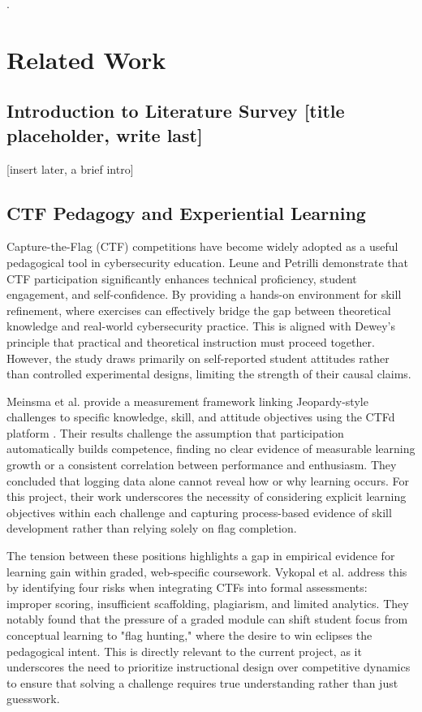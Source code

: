 \newpage
.
\newpage



\section{Related Work}

\subsection{Introduction to Literature Survey [title placeholder, write last]}
[insert later, a brief intro]


\subsection{CTF Pedagogy and Experiential Learning}
Capture-the-Flag (CTF) competitions have become widely adopted as a
useful pedagogical tool in cybersecurity education. Leune and Petrilli \cite{KeesPetrelli} demonstrate that CTF participation significantly enhances technical proficiency, student engagement, and self-confidence. By providing a hands-on environment for skill refinement, where exercises can effectively bridge the gap between theoretical knowledge and real-world cybersecurity practice. This is aligned with Dewey's principle that practical and theoretical instruction must proceed together. However, the study draws primarily on self-reported student attitudes rather than controlled experimental designs, limiting the strength of their causal claims.

Meinsma et al. \cite{Meinsma2022} provide a measurement framework linking Jeopardy-style challenges to specific knowledge, skill, and attitude objectives using the CTFd platform \cite{CTFd}. Their results challenge the assumption that participation automatically builds competence, finding no clear evidence of measurable learning growth or a consistent correlation between performance and enthusiasm. They concluded that logging data alone cannot reveal how or why learning occurs. For this project, their work underscores the necessity of considering explicit learning objectives within each challenge and capturing process-based evidence of skill development rather than relying solely on flag completion.

The tension between these positions highlights a gap in empirical evidence for learning gain within graded, web-specific coursework. Vykopal et al. \cite{Vykopal} address this by identifying four risks when integrating CTFs into formal assessments: improper scoring, insufficient scaffolding, plagiarism, and limited analytics. They notably found that the pressure of a graded module can shift student focus from conceptual learning to "flag hunting," where the desire to win eclipses the pedagogical intent. This is directly relevant to the current project, as it underscores the need to prioritize instructional design over competitive dynamics to ensure that solving a challenge requires true understanding rather than just guesswork.

